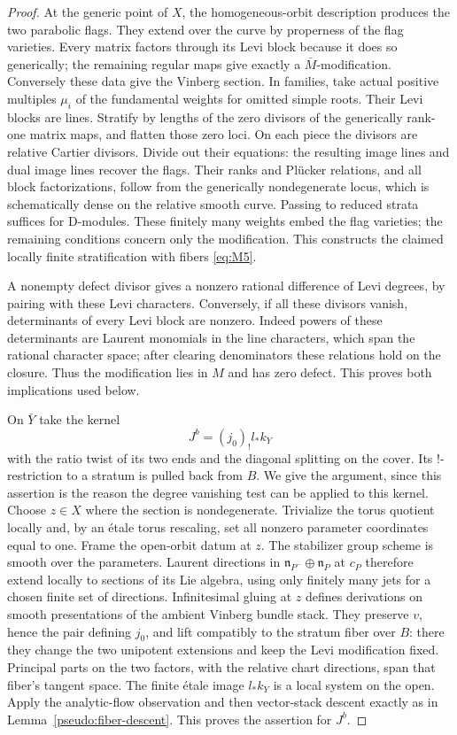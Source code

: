 \documentclass[11pt]{article}
\numberwithin{equation}{section}
\theoremstyle{definition}
\theoremstyle{remark}
\begin{document}
\begin{proof}
At the generic point of $X$, the homogeneous-orbit description produces
the two parabolic flags.  They extend over the curve by properness of the
flag varieties.  Every matrix factors through its Levi block because it
does so generically; the remaining regular maps give exactly a
$\bar M$-modification.  Conversely these data give the Vinberg section.
In families, take actual positive multiples $\mu_i$ of the fundamental
weights for omitted simple roots.  Their Levi blocks are lines.  Stratify
by lengths of the zero divisors of the generically rank-one matrix maps,
and flatten those zero loci.  On each piece the divisors are relative
Cartier divisors.  Divide out their equations: the resulting image lines
and dual image lines recover the flags.  Their ranks and Pl\"ucker
relations, and all block factorizations, follow from the generically
nondegenerate locus, which is schematically dense on the relative smooth
curve.  Passing to reduced strata suffices for D-modules.  These finitely
many weights embed the flag varieties; the remaining conditions concern
only the modification.  This constructs the claimed locally finite
stratification with fibers \eqref{eq:M5}.

A nonempty defect divisor gives a nonzero rational difference of Levi
degrees, by pairing with these Levi characters.  Conversely, if all these
divisors vanish, determinants of every Levi block are nonzero.  Indeed
powers of these determinants are Laurent monomials in the line characters,
which span the rational character space; after clearing denominators these
relations hold on the closure.  Thus the modification lies in $M$ and has
zero defect.  This proves both implications used below.

On $\bar Y$ take the kernel
\[
 J^b=(j_0)_!l_*k_Y
\]
with the ratio twist of its two ends and the diagonal splitting on the
cover.  Its !-restriction to a stratum is pulled back from $B$.  We give the
argument, since this assertion is the reason the degree vanishing test can
be applied to this kernel.  Choose $z\in X$ where the section is
nondegenerate.  Trivialize the torus quotient locally and, by an \'{e}tale
torus rescaling, set all nonzero parameter coordinates equal to one.
Frame the open-orbit datum at $z$.  The stabilizer group scheme is smooth
over the parameters.  Laurent directions in
$\mathfrak n_{P^-}\oplus\mathfrak n_P$ at $c_P$ therefore extend locally to
sections of its Lie algebra, using only finitely many jets for a chosen
finite set of directions.  Infinitesimal gluing at $z$ defines derivations
on smooth presentations of the ambient Vinberg bundle stack.  They
preserve $v$, hence the pair defining $j_0$, and lift compatibly to the
stratum fiber over $B$: there they change the two unipotent extensions and
keep the Levi modification fixed.  Principal parts on the two factors,
with the relative chart directions, span that fiber's tangent space.
The finite \'{e}tale image $l_*k_Y$ is a local system on the open.  Apply
the analytic-flow observation and then vector-stack descent exactly as in
Lemma~\ref{pseudo:fiber-descent}.  This proves the assertion for $J^b$.


\end{proof}
\end{document}
